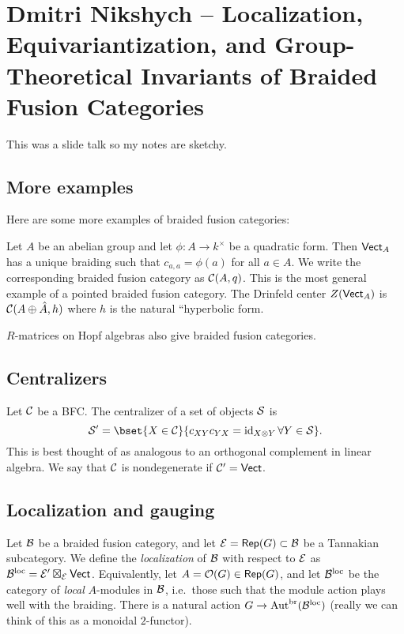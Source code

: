 \documentclass{amsart}
\begin{document}
\section{Dmitri Nikshych -- Localization, Equivariantization, and Group-Theoretical Invariants of Braided Fusion Categories}

This was a slide talk so my notes are sketchy.

\subsection{More examples}

Here are some more examples of braided fusion categories:

\begin{ex}
  Let $A$ be an abelian group and let $\phi: A \to k^\times$ be a quadratic form.
  Then $\mathsf{Vect}_A$ has a unique braiding such that $c_{a,a} = \phi(a)$ for all $a \in A$.
  We write the corresponding braided fusion category as $\mathcal{C}(A, q)$.
  This is the most general example of a pointed braided fusion category.
  The Drinfeld center $Z(\mathsf{Vect}_A)$ is $\mathcal{C}(A \oplus \hat{A}, h)$ where $h$ is the natural ``hyperbolic form.
\end{ex}

\begin{ex}
  $R$-matrices on Hopf algebras also give braided fusion categories.
\end{ex}

\subsection{Centralizers}

Let $\mathcal{C}$ be a BFC.
The centralizer of a set of objects $\mathcal{S}$ is
\[
  \Sc' = \bset{X \in \Cc}{c_{XY} c_{YX} = \id_{X \otimes Y} \forall Y \in \Sc}.
\]
This is best thought of as analogous to an orthogonal complement in linear algebra.
We say that $\mathcal{C}$ is nondegenerate if $\mathcal{C}' = \mathsf{Vect}$.

\subsection{Localization and gauging}

Let $\mathcal{B}$ be a braided fusion category, and let $\mathcal{E} = \operatorname{\mathsf{Rep}}(G) \subset \mathcal{B}$ be a Tannakian subcategory.
We define the \emph{localization} of $\mathcal{B}$ with respect to $\mathcal{E}$ as $\mathcal{B}^{\mathrm{loc}} = \mathcal{E}' \boxtimes_{\mathcal{E}} \mathsf{Vect}$.
Equivalently, let $A = \mathcal{O}(G) \in \operatorname{\mathsf{Rep}}(G)$, and let $\mathcal{B}^{\mathrm{loc}}$ be the category of \emph{local} $A$-modules in $\mathcal{B}$, i.e.\ those such that the module action plays well with the braiding.
There is a natural action $G \to \operatorname{Aut}^{\mathrm{br}}(\mathcal{B}^{\mathrm{loc}})$ (really we can think of this as a monoidal $2$-functor).
\end{document}

